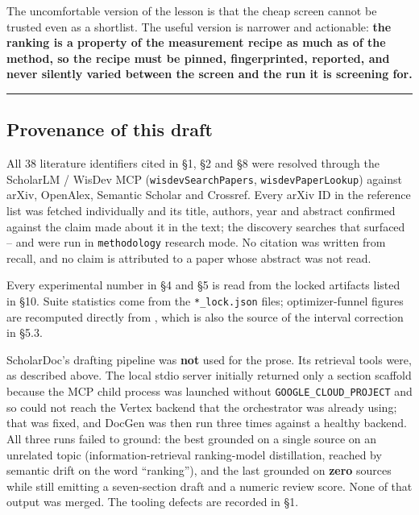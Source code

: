 The uncomfortable version of the lesson is that the cheap screen cannot be trusted even as a
shortlist. The useful version is narrower and actionable: \textbf{the ranking is a property of the
measurement recipe as much as of the method, so the recipe must be pinned, fingerprinted,
reported, and never silently varied between the screen and the run it is screening for.}

\begin{center}\rule{0.5\linewidth}{0.5pt}\end{center}

\subsection{Provenance of this draft}\label{provenance-of-this-draft}

All 38 literature identifiers cited in \S1, \S2 and \S8 were resolved through the ScholarLM / WisDev
MCP (\texttt{wisdevSearchPapers}, \texttt{wisdevPaperLookup}) against arXiv, OpenAlex, Semantic Scholar and
Crossref. Every arXiv ID in the reference list was fetched individually and its title, authors,
year and abstract confirmed against the claim made about it in the text; the discovery searches
that surfaced \cite{ref29}--\cite{ref32} and \cite{ref35} were run in \texttt{methodology} research mode. No citation was written
from recall, and no claim is attributed to a paper whose abstract was not read.

Every experimental number in \S4 and \S5 is read from the locked artifacts listed in \S10. Suite
statistics come from the \texttt{*\_lock.json} files; optimizer-funnel figures are recomputed directly
from , which is also the source of the interval correction
in \S5.3.

ScholarDoc's drafting pipeline was \textbf{not} used for the prose. Its retrieval tools were, as
described above. The local stdio server initially returned only a section scaffold because the
MCP child process was launched without \texttt{GOOGLE\_CLOUD\_PROJECT} and so could not reach the Vertex
backend that the orchestrator was already using; that was fixed, and DocGen was then run three
times against a healthy backend. All three runs failed to ground: the best grounded on a single
source on an unrelated topic (information-retrieval ranking-model distillation, reached by
semantic drift on the word ``ranking''), and the last grounded on \textbf{zero} sources while still
emitting a seven-section draft and a numeric review score. None of that output was merged. The
tooling defects are recorded in  \S1.


